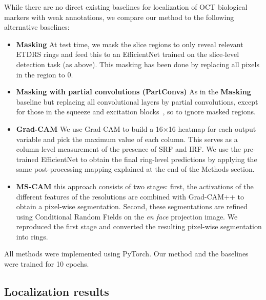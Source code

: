 While there are no direct existing baselines for localization of OCT biological markers with weak annotations, we compare our method to the following alternative baselines:
\begin{itemize}
    \item \textbf{Masking} At test time, we mask the slice regions to only reveal relevant ETDRS rings and feed this to an EfficientNet trained on the slice-level detection task (as above). This masking has been done by replacing all pixels in the region to $0$.
    
    \item \textbf{Masking with partial convolutions (PartConvs)} As in the \textbf{Masking} baseline but replacing all convolutional layers by partial convolutions, except for those in the squeeze and excitation blocks~, so to ignore masked regions.
    
    \item \textbf{Grad-CAM} We use Grad-CAM to build a 16×16 heatmap for each output variable and pick the maximum value of each column. This serves as a column-level measurement of the presence of SRF and IRF. We use the pre-trained EfficientNet to obtain the final ring-level predictions by applying the same post-processing mapping explained at the end of the Methods section.

    \item \textbf{MS-CAM} this approach consists of two stages: first, the activations of the different features of the resolutions are combined with Grad-CAM++ to obtain a pixel-wise segmentation. Second, these segmentations are refined using Conditional Random Fields on the \textit{en face} projection image. We reproduced the first stage and converted the resulting pixel-wise segmentation into rings. 
\end{itemize}

All methods were implemented using PyTorch. Our method and the baselines were trained for 10 epochs.

\subsection{Localization results}

